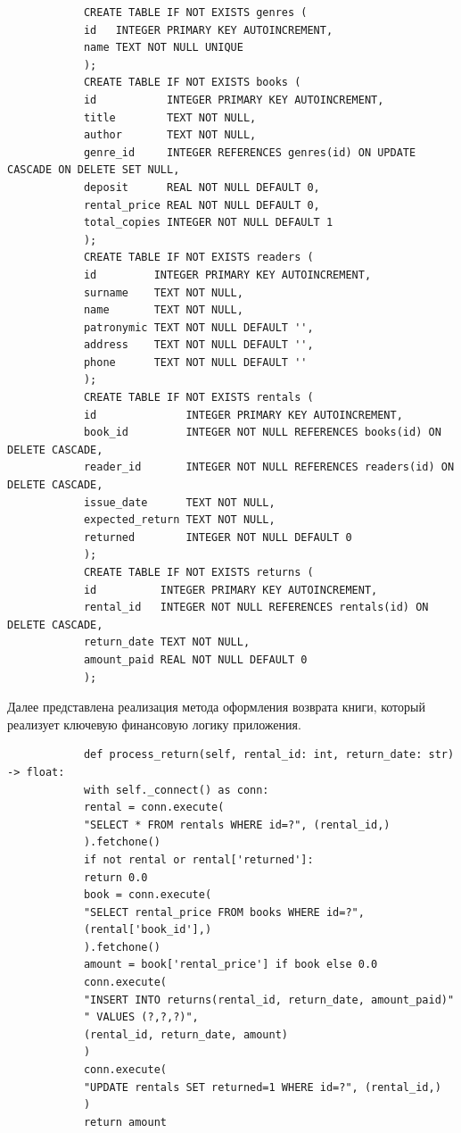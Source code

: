 \documentclass[14pt]{extreport}
\begin{document}
	\begin{listing}[H]
		\begin{verbatim}
			CREATE TABLE IF NOT EXISTS genres (
			id   INTEGER PRIMARY KEY AUTOINCREMENT,
			name TEXT NOT NULL UNIQUE
			);
			CREATE TABLE IF NOT EXISTS books (
			id           INTEGER PRIMARY KEY AUTOINCREMENT,
			title        TEXT NOT NULL,
			author       TEXT NOT NULL,
			genre_id     INTEGER REFERENCES genres(id) ON UPDATE CASCADE ON DELETE SET NULL,
			deposit      REAL NOT NULL DEFAULT 0,
			rental_price REAL NOT NULL DEFAULT 0,
			total_copies INTEGER NOT NULL DEFAULT 1
			);
			CREATE TABLE IF NOT EXISTS readers (
			id         INTEGER PRIMARY KEY AUTOINCREMENT,
			surname    TEXT NOT NULL,
			name       TEXT NOT NULL,
			patronymic TEXT NOT NULL DEFAULT '',
			address    TEXT NOT NULL DEFAULT '',
			phone      TEXT NOT NULL DEFAULT ''
			);
			CREATE TABLE IF NOT EXISTS rentals (
			id              INTEGER PRIMARY KEY AUTOINCREMENT,
			book_id         INTEGER NOT NULL REFERENCES books(id) ON DELETE CASCADE,
			reader_id       INTEGER NOT NULL REFERENCES readers(id) ON DELETE CASCADE,
			issue_date      TEXT NOT NULL,
			expected_return TEXT NOT NULL,
			returned        INTEGER NOT NULL DEFAULT 0
			);
			CREATE TABLE IF NOT EXISTS returns (
			id          INTEGER PRIMARY KEY AUTOINCREMENT,
			rental_id   INTEGER NOT NULL REFERENCES rentals(id) ON DELETE CASCADE,
			return_date TEXT NOT NULL,
			amount_paid REAL NOT NULL DEFAULT 0
			);
		\end{verbatim}
	\end{listing}
	
	Далее представлена реализация метода оформления возврата книги, который реализует ключевую финансовую логику приложения.
	
	\begin{listing}[H]
		\begin{verbatim}
			def process_return(self, rental_id: int, return_date: str) -> float:
			with self._connect() as conn:
			rental = conn.execute(
			"SELECT * FROM rentals WHERE id=?", (rental_id,)
			).fetchone()
			if not rental or rental['returned']:
			return 0.0
			book = conn.execute(
			"SELECT rental_price FROM books WHERE id=?",
			(rental['book_id'],)
			).fetchone()
			amount = book['rental_price'] if book else 0.0
			conn.execute(
			"INSERT INTO returns(rental_id, return_date, amount_paid)"
			" VALUES (?,?,?)",
			(rental_id, return_date, amount)
			)
			conn.execute(
			"UPDATE rentals SET returned=1 WHERE id=?", (rental_id,)
			)
			return amount
		\end{verbatim}
	\end{listing}
	
\end{document}
